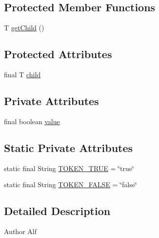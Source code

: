 \subsection*{Protected Member Functions}
\begin{DoxyCompactItemize}
\item 
T \hyperlink{classgov_1_1nasa_1_1jpf_1_1inspector_1_1server_1_1expression_1_1_expression_state_unary_operator_a150bac338d6557f79ca185d3f6ad6e06}{get\+Child} ()
\end{DoxyCompactItemize}
\subsection*{Protected Attributes}
\begin{DoxyCompactItemize}
\item 
final T \hyperlink{classgov_1_1nasa_1_1jpf_1_1inspector_1_1server_1_1expression_1_1_expression_state_unary_operator_a66041b1f569a361549e28a00f7ca5f2f}{child}
\end{DoxyCompactItemize}
\subsection*{Private Attributes}
\begin{DoxyCompactItemize}
\item 
final boolean \hyperlink{classgov_1_1nasa_1_1jpf_1_1inspector_1_1server_1_1expression_1_1expressions_1_1_expression_state_value_const_boolean_ade9702d2cd4df8d8a3f6ace0b0475fba}{value}
\end{DoxyCompactItemize}
\subsection*{Static Private Attributes}
\begin{DoxyCompactItemize}
\item 
static final String \hyperlink{classgov_1_1nasa_1_1jpf_1_1inspector_1_1server_1_1expression_1_1expressions_1_1_expression_state_value_const_boolean_af1f9386969e81bd2d0cb0c7be7097f10}{T\+O\+K\+E\+N\+\_\+\+T\+R\+UE} = \char`\"{}true\char`\"{}
\item 
static final String \hyperlink{classgov_1_1nasa_1_1jpf_1_1inspector_1_1server_1_1expression_1_1expressions_1_1_expression_state_value_const_boolean_abe36baf217fea58254e4781aa72a904b}{T\+O\+K\+E\+N\+\_\+\+F\+A\+L\+SE} = \char`\"{}false\char`\"{}
\end{DoxyCompactItemize}


\subsection{Detailed Description}
\begin{DoxyAuthor}{Author}
Alf 
\end{DoxyAuthor}


